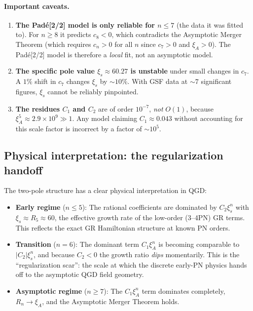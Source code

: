 \documentclass[11pt,a4paper]{article}
\theoremstyle{plain}
\theoremstyle{definition}
\theoremstyle{remark}
\newcommand{\xiA}{\xi_A}
\begin{document}
\paragraph{Important caveats.}
\begin{enumerate}[noitemsep]
  \item \textbf{The Pad\'e[2/2] model is only reliable for $n \leq 7$} (the data
    it was fitted to).  For $n \geq 8$ it predicts $c_8 < 0$, which contradicts
    the Asymptotic Merger Theorem (which requires $c_n > 0$ for all $n$ since
    $c_7 > 0$ and $\xiA > 0$).  The Pad\'e[2/2] model is therefore a
    \emph{local} fit, not an asymptotic model.
  \item \textbf{The specific pole value $\xi_s \approx 60.27$ is unstable} under
    small changes in $c_7$.  A $1\%$ shift in $c_7$ changes $\xi_s$ by $\sim 10\%$.
    With GSF data at $\sim 7$ significant figures, $\xi_s$ cannot be reliably
    pinpointed.
  \item \textbf{The residues $C_1$ and $C_2$} are of order $10^{-7}$, \emph{not}
    $O(1)$, because $\xiA^5 \approx 2.9\times10^9 \gg 1$.  Any model claiming
    $C_1 \approx 0.043$ without accounting for this scale factor is incorrect
    by a factor of $\sim 10^5$.
\end{enumerate}

\subsection{Physical interpretation: the regularization handoff}

The two-pole structure has a clear physical interpretation in QGD:

\begin{itemize}[nosep]
  \item \textbf{Early regime} ($n \leq 5$): The rational coefficients are
    dominated by $C_2 \xi_s^n$ with $\xi_s \approx R_5 \approx 60$, the effective
    growth rate of the low-order (3--4PN) GR terms.  This reflects the exact GR
    Hamiltonian structure at known PN orders.
  \item \textbf{Transition} ($n = 6$): The dominant term $C_1\xiA^n$ is becoming
    comparable to $|C_2|\xi_s^n$, and because $C_2 < 0$ the growth ratio
    \emph{dips} momentarily.  This is the ``regularization scar'': the scale at
    which the discrete early-PN physics hands off to the asymptotic QGD field geometry.
  \item \textbf{Asymptotic regime} ($n \geq 7$): The $C_1\xiA^n$ term dominates
    completely, $R_n \to \xiA$, and the Asymptotic Merger Theorem holds.
\end{itemize}
\end{document}

